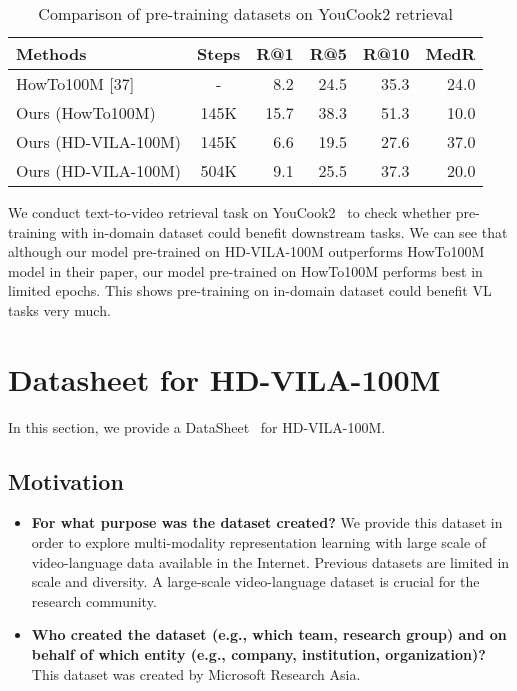 \begin{table}[h]
\footnotesize
\setlength\tabcolsep{4pt}
    \centering
    \begin{tabular}{l c r r r r} 
    \hline
    Methods  & Steps & R@1  & R@5  & R@10  & MedR  \\
    \hline\hline
    HowTo100M [37] & - & 8.2  & 24.5 & 35.3  & 24.0  \\ 
    Ours (HowTo100M) & 145K & 15.7 & 38.3 & 51.3  & 10.0 \\
    Ours (HD-VILA-100M) & 145K & 6.6 & 19.5 & 27.6  & 37.0  \\
    Ours (HD-VILA-100M) & 504K & 9.1 & 25.5 & 37.3  & 20.0  \\
    \hline
    \end{tabular}
\caption{\footnotesize Comparison of pre-training datasets on YouCook2 retrieval}
    \label{tab:rebut_2}
\end{table}

We conduct text-to-video retrieval task on YouCook2~\cite{Zhou2018TowardsAL} to check whether pre-training with in-domain dataset could benefit downstream tasks. We can see that although our model pre-trained on HD-VILA-100M outperforms HowTo100M model in their paper, our model pre-trained on HowTo100M performs best in limited epochs. This shows pre-training on in-domain dataset could benefit VL tasks very much.

\section{Datasheet for HD-VILA-100M}
In this section, we provide a DataSheet~\cite{gebru2021datasheets} for HD-VILA-100M.


\subsection{Motivation}

\begin{itemize}

\item \textbf{For what purpose was the dataset created?}
We provide this dataset in order to explore multi-modality representation learning with large scale of video-language data available in the Internet. Previous datasets are limited in scale and diversity. A large-scale video-language dataset is crucial for the research community.

\item \textbf{Who created the dataset (e.g., which team, research group) and on behalf of which entity (e.g., company, institution, organization)?}
This dataset was created by Microsoft Research Asia.

\end{itemize}

